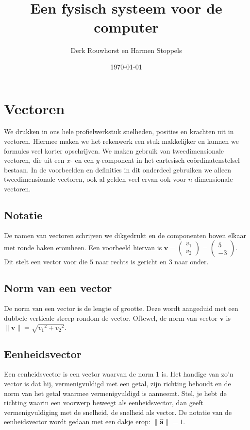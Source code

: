\documentclass[12pt,a4paper]{article}
\title{Een fysisch systeem voor de computer}
\date{\today}
\author{Derk Rouwhorst en Harmen Stoppels}
\begin{document}
	\begin{titlepage}
	\maketitle
	\end{titlepage}

	\tableofcontents
	\newpage
	
	\section{Vectoren}
	We drukken in ons hele profielwerkstuk snelheden, posities en krachten uit in vectoren. Hiermee maken we het rekenwerk een stuk makkelijker en kunnen we formules veel korter opschrijven. We maken gebruik van tweedimensionale vectoren, die uit een $x$- en een $y$-component in het cartesisch co\"{o}rdinatenstelsel bestaan. In de voorbeelden en definities in dit onderdeel gebruiken we alleen tweedimensionale vectoren, ook al gelden veel ervan ook voor $n$-dimensionale vectoren.
	
	\subsection{Notatie}
	De namen van vectoren schrijven we dikgedrukt en de componenten boven elkaar met ronde haken eromheen. Een voorbeeld hiervan is $\mathbf{v} = \begin{pmatrix} v_1 \\ v_2 \end{pmatrix} = \begin{pmatrix} 5 \\ -3 \end{pmatrix}$. Dit stelt een vector voor die $5$ naar rechts is gericht en $3$ naar onder.
	
	\subsection{Norm van een vector}
	De norm van een vector is de lengte of grootte. Deze wordt aangeduid met een dubbele verticale streep rondom de vector. Oftewel, de norm van vector $\mathbf{v}$ is $\|\mathbf{v}\| = \sqrt{{v_1}^2+{v_2}^2}$.
	
	\subsection{Eenheidsvector}
	Een eenheidsvector is een vector waarvan de norm 1 is. Het handige van zo'n vector is dat hij, vermenigvuldigd met een getal, zijn richting behoudt en de norm van het getal waarmee vermenigvuldigd is aanneemt. Stel, je hebt de richting waarin een voorwerp beweegt als eenheidsvector, dan geeft vermenigvuldiging met de snelheid, de snelheid als vector. De notatie van de eenheidsvector wordt gedaan met een dakje erop: $\|\mathbf{\hat{a}}\| = 1$.
	
\end{document}
